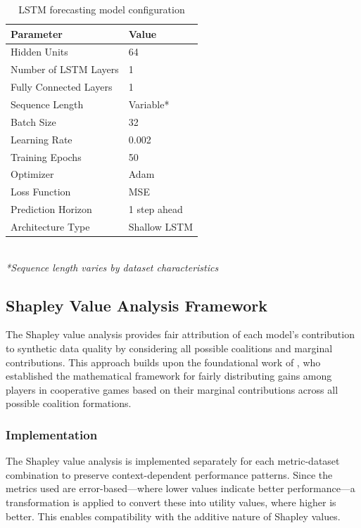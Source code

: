\documentclass[11pt]{article}
\begin{document}
\begin{table}[H]
\centering
\caption{LSTM forecasting model configuration}
\label{tab:lstm_params}
\small
\begin{tabular}{ll}
\toprule
\textbf{Parameter} & \textbf{Value} \\
\midrule
Hidden Units & 64 \\
Number of LSTM Layers & 1 \\
Fully Connected Layers & 1 \\
Sequence Length & Variable* \\
Batch Size & 32 \\
Learning Rate & 0.002 \\
Training Epochs & 50 \\
Optimizer & Adam \\
Loss Function & MSE \\
Prediction Horizon & 1 step ahead \\
Architecture Type & Shallow LSTM \\
\bottomrule
\end{tabular}
\\[0.5em]
\footnotesize
\textit{*Sequence length varies by dataset characteristics}
\end{table}

\subsection{Shapley Value Analysis Framework}

The Shapley value analysis provides fair attribution of each model's contribution to synthetic data quality by considering all possible coalitions and marginal contributions. This approach builds upon the foundational work of \textcite{shapley_P-295}, who established the mathematical framework for fairly distributing gains among players in cooperative games based on their marginal contributions across all possible coalition formations.

\subsubsection{Implementation}
The Shapley value analysis is implemented separately for each metric-dataset combination to preserve context-dependent performance patterns. Since the metrics used are error-based—where lower values indicate better performance—a transformation is applied to convert these into utility values, where higher is better. This enables compatibility with the additive nature of Shapley values.
\end{document}
